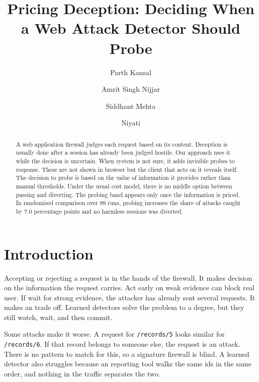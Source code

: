 \documentclass[runningheads]{llncs}
\begin{document}
\title{Pricing Deception: Deciding When a Web Attack Detector Should Probe}
\author{Parth Kansal \and Amrit Singh Nijjar \and Siddhant Mehta \and Niyati}
\maketitle

\begin{abstract}
A web application firewall judges each request based on its content. Deception is usually done after a session has already been judged hostile. Our approach uses it while the decision is uncertain. When system is not sure, it adds invisible probes to response. These are not shown in browser but the client that acts on it reveals itself. The decision to probe is based on the value of information it provides rather than manual thresholds. Under the usual cost model, there is no middle option between passing and diverting. The probing band appears only once the information is priced. In randomised comparison over 99 runs, probing increases the share of attacks caught by 7.0 percentage points and no harmless sessions was diverted.

\end{abstract}

\section{Introduction}

Accepting or rejecting a request is in the hands of the firewall. It makes decision on the information the request carries. Act early on weak evidence can block real user. If wait for strong evidence, the attacker has already sent several requests. It makes an trade off. Learned detectors \cite{kruegel2003anomaly,tekerek2021novel} solve the problem to a degree, but they still watch, wait, and then commit.

Some attacks make it  worse. A request for \texttt{/records/5} looks similar for \texttt{/records/6}. If that record belongs to someone else, the request is an attack. There is no pattern to match for this, so a signature firewall is blind. A learned detector also struggles because an reporting tool walks the same ids in the same order, and nothing in the traffic separates the two.
\end{document}
